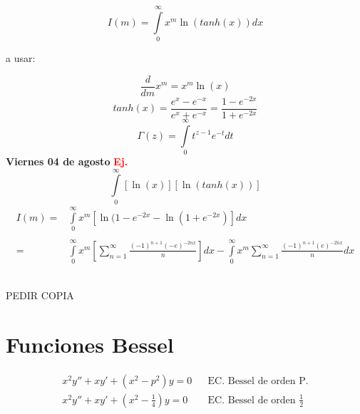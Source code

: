 \documentclass{article}
\theoremstyle{definition}
\begin{document}
\[I(m)=\int\limits^{\infty}_0x^m\ln(tanh(x))dx\]
\begin{center}
	a usar:
\end{center}
\[\frac{d}{dm}x^m=x^m\ln (x)\]
\[tanh(x)=\frac{e^x-e^{-x}}{e^x+e^{-x}}=\frac{1-e^{-2x}}{1+e^{-2x}}\]
\[\Gamma (z)=\int\limits^{\infty}_0t^{z-1}e^{-t}dt\]
\newpage
\textbf{Viernes 04 de agosto}
\textbf{\textcolor{red}{Ej.}}
\[	\int\limits^{\infty}_0\left[\ln (x)\right]\left[\ln (tanh(x))\right]\]
\[
\begin{array}{rl}
	I(m)=& \int\limits^{\infty}_0 x^m\left[ \ln (1-e^{-2x}-\ln (1+e^{-2x})\right]dx\\ \\
	=& \int\limits^{\infty}_0 x^m\left[ \sum\limits^{\infty}_{n=1}\frac{(-1)^{n+1}(-e)^{-2nx}}{n} \right]dx -\int\limits^{\infty}_0 x^m \sum\limits^{\infty}_{n=1} \frac{(-1)^{n+1}(e)^{-2nx}}{n}dx\\ \\
	\\
  


\end{array}
\]
\begin{center}
PEDIR COPIA
\section*{Funciones Bessel}
\begin{align*}
	x^2y''+xy'+(x^2-p^2)y=0 && \text{EC. Bessel de orden P.}\\
	x^2y''+xy'+(x^2-\frac{1}{4})y=0 && \text{EC. Bessel de orden } \frac{1}{2}\\
\end{align*}
\end{center}
\end{document}
